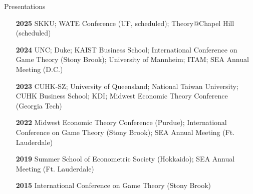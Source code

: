 \begin{rSection}{Presentations}

\begin{itemize}
	\item [\textbf{2025}] SKKU; WATE Conference (UF, scheduled); Theory@Chapel Hill (scheduled)
	\item [\textbf{2024}] UNC; Duke; KAIST Business School; International Conference on Game Theory (Stony Brook); University of Mannheim; ITAM; SEA Annual Meeting (D.C.)
	\item [\textbf{2023}] CUHK-SZ; University of Queensland; National Taiwan University; CUHK Business School; KDI; Midwest Economic Theory Conference (Georgia Tech)
	\item [\textbf{2022}] Midwest Economic Theory Conference (Purdue); International Conference on Game Theory (Stony Brook); SEA Annual Meeting (Ft. Lauderdale)
	\item [\textbf{2019}] Summer School of Econometric Society (Hokkaido); SEA Annual Meeting (Ft. Lauderdale)
	\item [\textbf{2015}] International Conference on Game Theory (Stony Brook)
\end{itemize}
	

\end{rSection}
